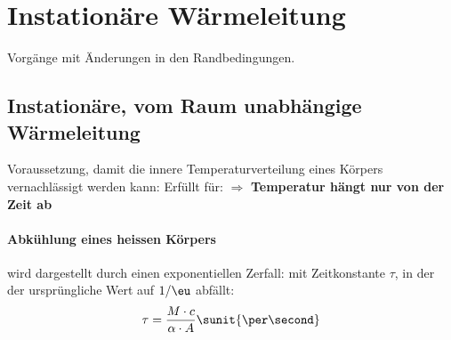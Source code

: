 
\section{Instationäre Wärmeleitung} %
	Vorgänge mit Änderungen in den Randbedingungen.
	
	\subsection{Instationäre, vom Raum un\-ab\-hängige Wärme\-leitung} %
		Voraussetzung, damit die innere Temperaturverteilung eines Körpers vernachlässigt werden kann:
		Erfüllt für:
		$\Rightarrow$ \textbf{Temperatur hängt nur von der Zeit ab}
		
		\paragraph{Abkühlung eines heissen Körpers} %
			wird dargestellt durch einen exponentiellen Zerfall:
			mit Zeitkonstante $\tau$, in der der ursprüngliche Wert auf $1/\eu$ abfällt:
			\[
				\tau = \frac{M\cdot c}{\alpha \cdot A} \sunit{\per\second}
			\]
			
